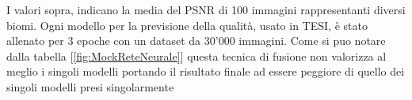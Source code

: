     I valori sopra, indicano la media del PSNR di 100 immagini rappresentanti diversi biomi.
    Ogni modello per la previsione della qualità, usato in TESI, 
    è stato allenato per 3 epoche con un dataset da 30'000 
    immagini. Come si puo notare dalla tabella [\ref{fig:MockReteNeurale}] 
    questa tecnica di fusione non valorizza al meglio i singoli modelli 
    portando il risultato finale ad essere peggiore di quello dei 
    singoli modelli presi singolarmente
    


